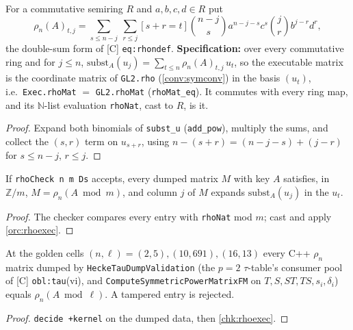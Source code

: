 \begin{definition}\label{orc:rhoexec}
  \leanok
  For a commutative semiring $R$ and $a,b,c,d\in R$ put
  \[
    \rho_n(A)_{t,j}=\sum_{s\le n-j}\ \sum_{r\le j}[s+r=t]\binom{n-j}{s}a^{n-j-s}c^{s}\binom{j}{r}b^{j-r}d^{r},
  \]
  the double-sum form of [C] \texttt{eq:rhondef}. \textbf{Specification:} over every commutative ring and for $j\le n$,
  $\mathrm{subst}_A(u_j)=\sum_{t\le n}\rho_n(A)_{t,j}\,u_t$, so the executable matrix is the coordinate matrix of
  \texttt{GL2.rho} (\ref{conv:symconv}) in the basis $(u_t)$, i.e.\ \texttt{Exec.rhoMat} $=$ \texttt{GL2.rhoMat}
  (\texttt{rhoMat\_eq}). It commutes with every ring map, and its $\mathbb N$-list
  evaluation \texttt{rhoNat}, cast to $R$, is it.
\end{definition}
\begin{proof}
  \leanok
  Expand both binomials of \texttt{subst\_u} (\texttt{add\_pow}), multiply the sums, and collect the $(s,r)$ term on
  $u_{s+r}$, using $n-(s+r)=(n-j-s)+(j-r)$ for $s\le n-j$, $r\le j$.
\end{proof}

\begin{theorem}\label{chk:rhoexec}
  \leanok
  If \texttt{rhoCheck n m Ds} accepts, every dumped matrix $M$ with key $A$ satisfies, in $\mathbb Z/m$,
  $M=\rho_n(A\bmod m)$, and column $j$ of $M$ expands $\mathrm{subst}_A(u_j)$ in the $u_t$.
\end{theorem}
\begin{proof}
  \leanok
  The checker compares every entry with \texttt{rhoNat} mod $m$; cast and apply \ref{orc:rhoexec}.
\end{proof}

\begin{theorem}\label{orc:rhogolden}
  \leanok
  At the golden cells $(n,\ell)=(2,5),(10,691),(16,13)$ every C++ $\rho_n$ matrix dumped by
  \texttt{HeckeTauDumpValidation} (the $p=2$ $\tau$-table's consumer pool of [C] \texttt{obl:tau}(vi), and
  \texttt{ComputeSymmetricPowerMatrixFM} on $T,S,ST,TS,s_i,\delta_i$) equals $\rho_n(A\bmod\ell)$. A tampered entry is
  rejected.
\end{theorem}
\begin{proof}
  \leanok
  \texttt{decide +kernel} on the dumped data, then \ref{chk:rhoexec}.
\end{proof}

